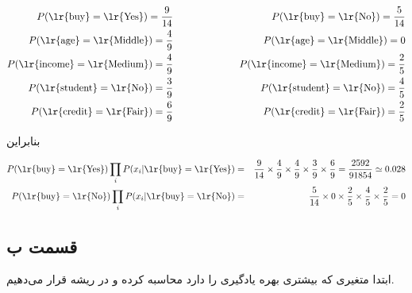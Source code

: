 \documentclass{article}
\begin{document}
\begin{eqnarray*}
    P(\text{\lr{buy}}=\text{\lr{Yes}}) = \frac{9}{14} & \hspace{2cm} & P(\text{\lr{buy}}=\text{\lr{No}}) = \frac{5}{14}\\
    P(\text{\lr{age}}=\text{\lr{Middle}}) = \frac{4}{9} & \hspace{2cm} & P(\text{\lr{age}}=\text{\lr{Middle}}) = 0 \\
    P(\text{\lr{income}}=\text{\lr{Medium}}) = \frac{4}{9} & \hspace{2cm} & P(\text{\lr{income}}=\text{\lr{Medium}}) = \frac{2}{5}\\
    P(\text{\lr{student}}=\text{\lr{No}}) = \frac{3}{9} & \hspace{2cm} & P(\text{\lr{student}}=\text{\lr{No}}) = \frac{4}{5}\\
    P(\text{\lr{credit}}=\text{\lr{Fair}}) = \frac{6}{9} & \hspace{2cm} & P(\text{\lr{credit}}=\text{\lr{Fair}}) = \frac{2}{5}\\
\end{eqnarray*}

بنابراین

\begin{eqnarray*}
    P(\text{\lr{buy}}=\text{\lr{Yes}})\prod_{i} P(x_i|\text{\lr{buy}}=\text{\lr{Yes}}) & = &  \frac{9}{14} \times \frac{4}{9} \times \frac{4}{9} \times \frac{3}{9} \times \frac{6}{9} = \frac{2592}{91854} \simeq 0.028\\
    P(\text{\lr{buy}}=\text{\lr{No}})\prod_{i} P(x_i|\text{\lr{buy}}=\text{\lr{No}})  & = & \frac{5}{14} \times 0 \times \frac{2}{5} \times \frac{4}{5} \times \frac{2}{5} = 0
\end{eqnarray*}

\subsection*{قسمت ب}

ابتدا متغیری که بیشتری بهره یادگیری را دارد محاسبه کرده و در ریشه قرار می‌دهیم.
\end{document}
